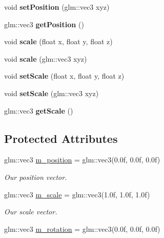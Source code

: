 \begin{DoxyCompactItemize}
void {\bfseries set\+Position} (glm\+::vec3 xyz)
\item 
\mbox{\label{classce_1_1game_1_1_transform_component_ae61537497dc93afed6a0d24d106bd77a}} 
glm\+::vec3 {\bfseries get\+Position} ()
\item 
\mbox{\label{classce_1_1game_1_1_transform_component_aa14fa9beaf944e5ca50bc171395ff4b1}} 
void {\bfseries scale} (float x, float y, float z)
\item 
\mbox{\label{classce_1_1game_1_1_transform_component_ad242b736f29e8998f4c629849b6167b0}} 
void {\bfseries scale} (glm\+::vec3 xyz)
\item 
\mbox{\label{classce_1_1game_1_1_transform_component_a86b2727e507a7888fb8c6a26123a7d8b}} 
void {\bfseries set\+Scale} (float x, float y, float z)
\item 
\mbox{\label{classce_1_1game_1_1_transform_component_af5840084e9c65ac550c1b563a301c5ca}} 
void {\bfseries set\+Scale} (glm\+::vec3 xyz)
\item 
\mbox{\label{classce_1_1game_1_1_transform_component_a0ddf26fc356dc2646575d65f3f628250}} 
glm\+::vec3 {\bfseries get\+Scale} ()
\end{DoxyCompactItemize}
\subsection*{Protected Attributes}
\begin{DoxyCompactItemize}
\item 
glm\+::vec3 \hyperlink{classce_1_1game_1_1_transform_component_a72b0b9f989fd7ddcecf0ebec18bd2076}{m\+\_\+position} = glm\+::vec3(0.\+0f, 0.\+0f, 0.\+0f)
\begin{DoxyCompactList}\small\item\em Our position vector. \end{DoxyCompactList}\item 
glm\+::vec3 \hyperlink{classce_1_1game_1_1_transform_component_af120345110ceff7bcf3b40d2ac1b0575}{m\+\_\+scale} = glm\+::vec3(1.\+0f, 1.\+0f, 1.\+0f)
\begin{DoxyCompactList}\small\item\em Our scale vector. \end{DoxyCompactList}\item 
glm\+::vec3 \hyperlink{classce_1_1game_1_1_transform_component_aacf1e75e976c54bb503448b6da534f63}{m\+\_\+rotation} = glm\+::vec3(0.\+0f, 0.\+0f, 0.\+0f)
\end{DoxyCompactItemize}
